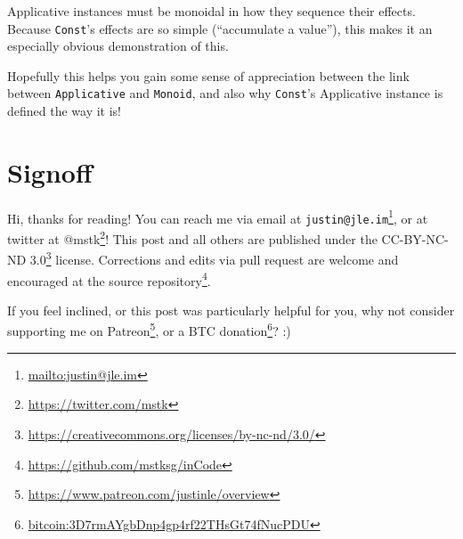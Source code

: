 \documentclass[]{article}
\renewcommand{\href}[2]{#2\footnote{\url{#1}}}
\begin{document}
Applicative instances must be monoidal in how they sequence their effects.
Because \texttt{Const}'s effects are so simple (``accumulate a value''), this
makes it an especially obvious demonstration of this.

Hopefully this helps you gain some sense of appreciation between the link
between \texttt{Applicative} and \texttt{Monoid}, and also why \texttt{Const}'s
Applicative instance is defined the way it is!

\section{Signoff}\label{signoff}

Hi, thanks for reading! You can reach me via email at
\href{mailto:justin@jle.im}{\nolinkurl{justin@jle.im}}, or at twitter at
\href{https://twitter.com/mstk}{@mstk}! This post and all others are published
under the \href{https://creativecommons.org/licenses/by-nc-nd/3.0/}{CC-BY-NC-ND
3.0} license. Corrections and edits via pull request are welcome and encouraged
at \href{https://github.com/mstksg/inCode}{the source repository}.

If you feel inclined, or this post was particularly helpful for you, why not
consider \href{https://www.patreon.com/justinle/overview}{supporting me on
Patreon}, or a \href{bitcoin:3D7rmAYgbDnp4gp4rf22THsGt74fNucPDU}{BTC donation}?
:)
\end{document}
